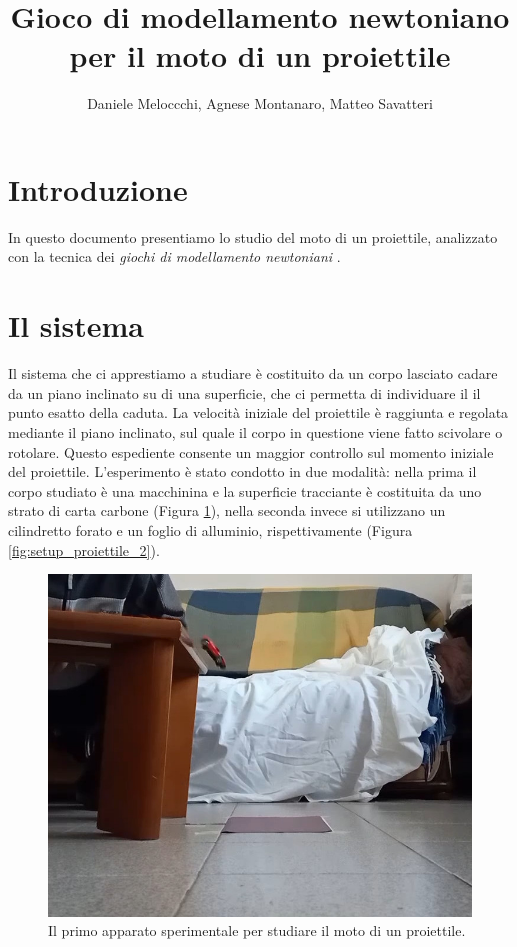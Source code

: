 \documentclass{article}
\title{Gioco di modellamento newtoniano per il moto di un proiettile}
\author{Daniele Meloccchi, Agnese Montanaro, Matteo Savatteri}
\begin{document}
\maketitle

\tableofcontents

\section{Introduzione}
In questo documento presentiamo lo studio del moto di un
proiettile, analizzato con la tecnica dei \emph{giochi di modellamento newtoniani}
\cite{hestenes1992modeling}.

\section{Il sistema}
Il sistema che ci apprestiamo a studiare è costituito da un corpo lasciato cadare da
un piano inclinato su di una superficie, che ci permetta di individuare il 
il punto esatto della caduta.  La velocità iniziale del proiettile è raggiunta e
regolata mediante il piano inclinato, sul quale il corpo in questione viene fatto scivolare
o rotolare. Questo espediente consente un maggior controllo sul momento iniziale del
proiettile. L'esperimento è stato condotto in due modalità: nella prima il corpo
studiato è una macchinina e la superficie tracciante è costituita da uno strato di
carta carbone (Figura \ref{fig:setup_proiettile_1}), nella seconda invece si utilizzano
un cilindretto forato e un foglio di alluminio, rispettivamente
(Figura \ref{fig:setup_proiettile_2}).

\begin{figure}
\centering
  \includegraphics[width=\textwidth]{setup_proiettile_piano_inclinato_1}
  \caption{Il primo apparato sperimentale per studiare il moto di un proiettile.}
  \label{fig:setup_proiettile_1}
\end{figure}
\end{document}
